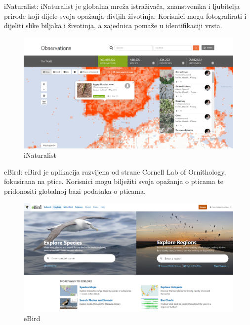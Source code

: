 		\begin{packed_item}
			\item iNaturalist: iNaturalist je globalna mreža istraživača, znanstvenika i ljubitelja prirode koji dijele svoja opažanja divljih životinja. Korisnici mogu fotografirati i dijeliti slike biljaka i životinja, a zajednica pomaže u identifikaciji vrsta. 
			\begin{figure}[H]
				\includegraphics[width=\textwidth]{slike/inaturalist.PNG} %
				\caption{iNaturalist}
				\label{fig:inaturalist} %
			\end{figure}
			
			\item eBird: eBird je aplikacija razvijena od strane Cornell Lab of Ornithology, fokusirana na ptice. Korisnici mogu bilježiti svoja opažanja o pticama te pridonositi globalnoj bazi podataka o pticama.
			\begin{figure}[H]
				\includegraphics[width=\textwidth]{slike/ebird.PNG} %
				\caption{eBird}
				\label{fig:ebird} %
			\end{figure}
			\item 
			

\end{packed_item}
